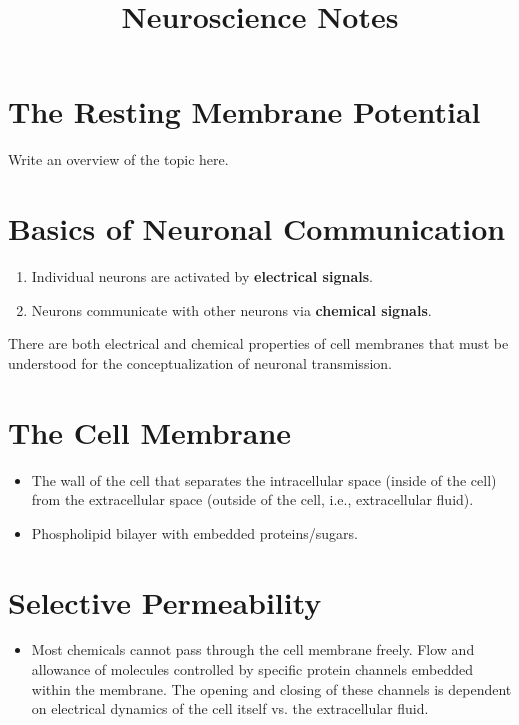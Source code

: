 \documentclass[12pt,a4paper]{article}
\title{\textbf{Neuroscience Notes}}
\author{}
\date{}
\begin{document}
	
	\maketitle
	\tableofcontents
	\newpage
	
	\section*{The Resting Membrane Potential}
	Write an overview of the topic here.
	
	\section{Basics of Neuronal Communication}
	\begin{enumerate}
		\item Individual neurons are activated by \textbf{electrical signals}. 
		\item Neurons communicate with other neurons via 
		\textbf{chemical signals}.
	\end{enumerate}
	
	There are both electrical and chemical properties of cell membranes that must be understood for the conceptualization of neuronal transmission. 
	
	\section{The Cell Membrane}
	\begin{itemize}
		\item The wall of the cell that separates the intracellular space (inside of the cell) from the extracellular space (outside of the cell, i.e., extracellular fluid).
		\item Phospholipid bilayer with embedded proteins/sugars. 
	\end{itemize}
	
	\section{Selective Permeability}
	
	\begin{itemize}
		\item Most chemicals cannot pass through the cell membrane freely.
		\subitem Flow and allowance of molecules controlled by specific protein channels embedded within the membrane. 
		\subitem The opening and closing of these channels is dependent on electrical dynamics of the cell itself vs. the extracellular fluid. 
	\end{itemize}
	
\end{document}
